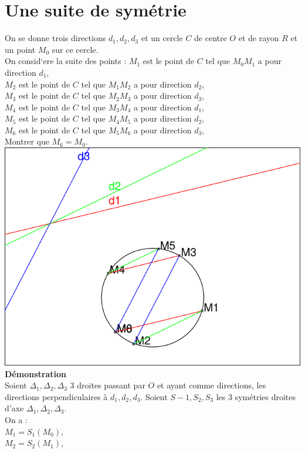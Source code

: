 \documentclass[a4paper,11pt]{book}
\begin{document}
\section{Une suite de sym\'etrie}
On se donne trois directions $d_1,d_2,d_3$ et un cercle $C$ de centre $O$ et de 
rayon $R$ et un point $M_0$ sur ce cercle.\\
On consid`ere la suite des points :
$M_1$ est le point de $C$ tel que $M_0M_1$ a pour direction $d_1$,\\
$M_2$ est le point de $C$ tel que $M_1M_2$ a pour direction $d_2$,\\
$M_3$ est le point de $C$ tel que $M_2M_3$ a pour direction $d_3$,\\
$M_4$ est le point de $C$ tel que $M_3M_4$ a pour direction $d_1$,\\
$M_5$ est le point de $C$ tel que $M_4M_5$ a pour direction $d_2$,\\
$M_6$ est le point de $C$ tel que $M_5M_6$ a pour direction $d_3$,\\
Montrer que $M_6=M_0$.\\
\includegraphics[width=\textwidth]{cassym}\\
{\bf D\'emonstration}\\
Soient $\Delta_1,\Delta_2,\Delta_3$ 3 droites passant par $O$ et ayant comme 
directions, les directions perpendiculaires \`a 
$d_1,d_2,d_3$. Soient $S-1,S_2,S_3$ les 3 sym\'etries droites d'axe 
$\Delta_1,\Delta_2,\Delta_3$.\\
On a :\\
$M_1=S_1(M_0)$,\\
$M_2=S_2(M_1)$,\\
\end{document}
